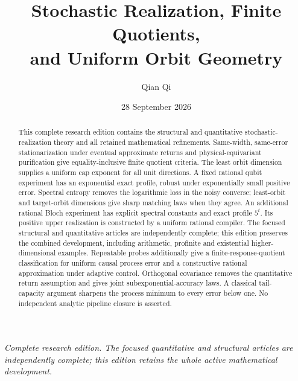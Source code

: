 \documentclass[11pt]{amsart}
\title[Stochastic realization and orbit geometry]{Stochastic Realization, Finite Quotients,\\and Uniform Orbit Geometry}
\author{Qian Qi}
\date{28 September 2026}
\numberwithin{equation}{section}
\theoremstyle{definition}\newtheorem{definition}[theorem]{Definition}
\theoremstyle{remark}\newtheorem{remark}[theorem]{Remark}
\begin{document}
\begin{abstract}
This complete research edition contains the structural and quantitative
stochastic-realization theory and all retained mathematical refinements.
Same-width, same-error stationarization under eventual approximate returns
and physical-equivariant purification give equality-inclusive finite
quotient criteria. The least orbit dimension supplies a uniform cap
exponent for all unit directions. A fixed rational qubit experiment has
an exponential exact profile, robust under exponentially small positive
error. Spectral entropy removes the logarithmic loss in the noisy
converse; least-orbit and target-orbit dimensions give sharp matching
laws when they agree. An additional rational Bloch experiment has
explicit spectral constants and exact profile $5^t$. Its positive upper realization is constructed by a uniform
rational compiler. The focused structural and quantitative articles are
independently complete; this edition preserves the combined development,
including arithmetic, profinite and existential higher-dimensional
examples. Repeatable probes additionally give a finite-response-quotient
classification for uniform causal process error and a constructive
rational approximation under adaptive control. Orthogonal covariance removes the quantitative return assumption and
gives joint subexponential-accuracy laws. A classical tail-capacity
argument sharpens the process minimum to every error below one.
No independent analytic pipeline closure is asserted.
\end{abstract}
\maketitle
\noindent\textit{Complete research edition. The focused quantitative and structural articles are independently complete; this edition retains the whole active mathematical development.}
\end{document}
